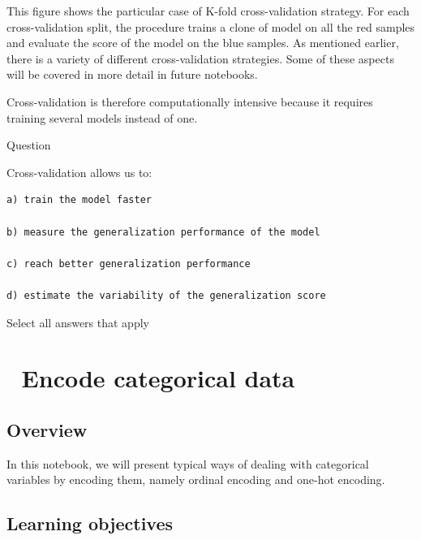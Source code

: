 \documentclass[
  letterpaper,
  DIV=11,
  numbers=noendperiod,
  oneside]{scrreprt}
\begin{document}
\begin{tcolorbox}[enhanced jigsaw, colbacktitle=quarto-callout-note-color!10!white, titlerule=0mm, breakable, opacityback=0, opacitybacktitle=0.6, left=2mm, coltitle=black, colback=white, title=\textcolor{quarto-callout-note-color}{\faInfo}\hspace{0.5em}{Note}, rightrule=.15mm, colframe=quarto-callout-note-color-frame, toprule=.15mm, bottomtitle=1mm, toptitle=1mm, arc=.35mm, bottomrule=.15mm, leftrule=.75mm]
This figure shows the particular case of K-fold cross-validation
strategy. For each cross-validation split, the procedure trains a clone
of model on all the red samples and evaluate the score of the model on
the blue samples. As mentioned earlier, there is a variety of different
cross-validation strategies. Some of these aspects will be covered in
more detail in future notebooks.
\end{tcolorbox}

Cross-validation is therefore computationally intensive because it
requires training several models instead of one.

Question

Cross-validation allows us to:

\begin{verbatim}
a) train the model faster

b) measure the generalization performance of the model

c) reach better generalization performance

d) estimate the variability of the generalization score
\end{verbatim}

Select all answers that apply

\hypertarget{encode-categorical-data}{%
\chapter{\texorpdfstring{{📙} Encode categorical
data}{📙 Encode categorical data}}\label{encode-categorical-data}}

\hypertarget{overview-10}{%
\section{Overview}\label{overview-10}}

In this notebook, we will present typical ways of dealing with
categorical variables by encoding them, namely ordinal encoding and
one-hot encoding.

\hypertarget{learning-objectives-10}{%
\section{Learning objectives}\label{learning-objectives-10}}
\end{document}

